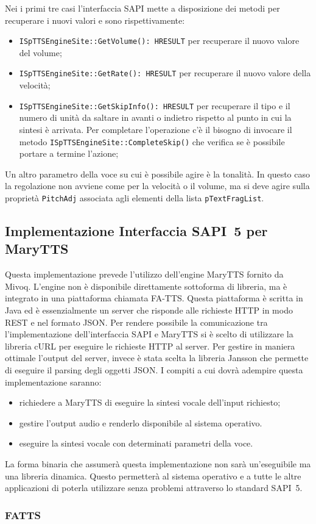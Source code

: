 	Nei i primi tre casi l'interfaccia SAPI mette a disposizione dei metodi per recuperare i nuovi valori e sono rispettivamente:
	\begin{itemize}
		\item \texttt{ISpTTSEngineSite::GetVolume(): HRESULT} per recuperare il nuovo valore del volume;
		\item \texttt{ISpTTSEngineSite::GetRate(): HRESULT} per recuperare il nuovo valore della velocità;
		\item \texttt{ISpTTSEngineSite::GetSkipInfo(): HRESULT} per recuperare il tipo e il numero di unità da saltare in avanti o indietro rispetto al punto in cui la sintesi è arrivata. Per completare l'operazione c'è il bisogno di invocare il metodo \texttt{ISpTTSEngineSite::CompleteSkip()} che verifica se è possibile portare a termine l'azione;
	\end{itemize}	
	Un altro parametro della voce su cui è possibile agire è la tonalità. In questo caso la regolazione non avviene come per la velocità o il volume, ma si deve agire sulla proprietà \texttt{PitchAdj} associata agli elementi della lista \texttt{pTextFragList}.
	\subsection{Implementazione Interfaccia SAPI~5 per MaryTTS}
	Questa implementazione prevede l'utilizzo dell'engine MaryTTS fornito da Mivoq. L'engine non è disponibile direttamente sottoforma di libreria, ma è integrato in una piattaforma chiamata FA-TTS. Questa piattaforma è scritta in Java ed è essenzialmente un server che risponde alle richieste HTTP in modo REST e nel formato JSON.
	Per rendere possibile la comunicazione tra l'implementazione dell'interfaccia SAPI e MaryTTS si è scelto di utilizzare la libreria cURL per eseguire le richieste HTTP al server.
	Per gestire in maniera ottimale l'output del server, invece è stata scelta la libreria Jansson che permette di eseguire il parsing degli oggetti JSON.
	I compiti a cui dovrà adempire questa implementazione saranno:
	\begin{itemize}
		\item richiedere a MaryTTS di eseguire la sintesi vocale dell'input richiesto;
		\item gestire l'output audio e renderlo disponibile al sistema operativo.
		\item eseguire la sintesi vocale con determinati parametri della voce.
	\end{itemize}
	La forma binaria che assumerà questa implementazione non sarà un'eseguibile ma una libreria dinamica. Questo permetterà al sistema operativo e a tutte le altre applicazioni di poterla utilizzare senza problemi attraverso lo standard SAPI~5.
	\subsubsection{FATTS}
	
	
	
	